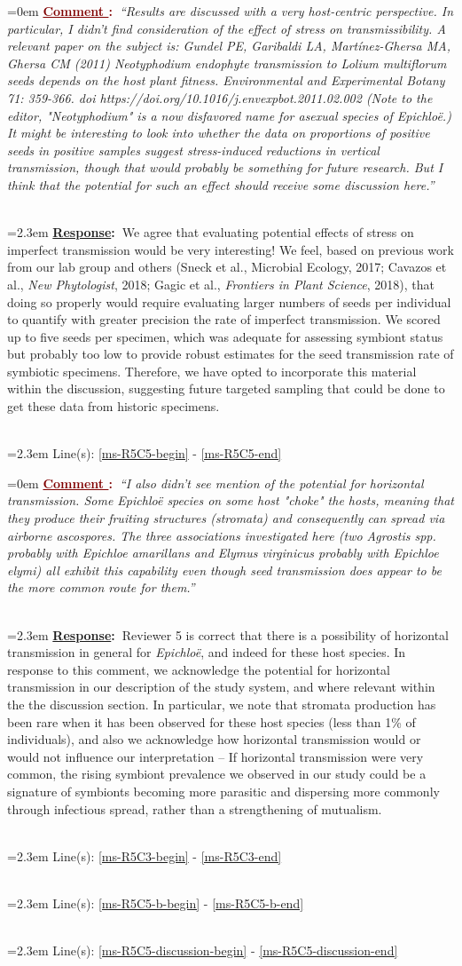 \documentclass[12pt]{article}
\newcounter{cN}
\newcommand{\comment}[1]{
	\vspace{2em}
	\refstepcounter{cN} %
	\noindent \hangindent=0em \textbf{\textcolor{Maroon}{\uline{Comment \thecN}:~}}\emph{``#1''}
	}
\newcommand{\response}[1]{
	\\[0.25em]
	\hangindent=2.3em \textbf{\textcolor{NavyBlue}{\uline{Response}:~}}#1
	}
\newcommand{\linesref}[2]{
		\\[0.25em]
	\hangindent=2.3em {\color{Mahogany} Line(s): \ref{#1} - \ref{#2}}
}
\begin{document}
\comment{Results are discussed with a very host-centric perspective. In particular, I didn't find consideration of the effect of stress on transmissibility. A relevant paper on the subject is: Gundel PE, Garibaldi LA, Martínez-Ghersa MA, Ghersa CM (2011) Neotyphodium endophyte transmission to Lolium multiflorum seeds depends on the host plant fitness. Environmental and Experimental Botany 71: 359-366. doi https://doi.org/10.1016/j.envexpbot.2011.02.002 (Note to the editor, "Neotyphodium" is a now disfavored name for asexual species of Epichloë.) It might be interesting to look into whether the data on proportions of positive seeds in positive samples suggest stress-induced reductions in vertical transmission, though that would probably be something for future research. But I think that the potential for such an effect should receive some discussion here.}
\response{We agree that evaluating potential effects of stress on imperfect transmission would be very interesting! We feel, based on previous work from our lab group and others (Sneck et al., {Microbial Ecology}, 2017; Cavazos et al., \emph{New Phytologist}, 2018; Gagic et al., \emph{Frontiers in Plant Science}, 2018), that doing so properly would require evaluating larger numbers of seeds per individual to quantify with greater precision the rate of imperfect transmission. 
We scored up to five seeds per specimen, which was adequate for assessing symbiont status but probably too low to provide robust estimates for the seed transmission rate of symbiotic specimens. 
Therefore, we have opted to incorporate this material within the discussion, suggesting future targeted sampling that could be done to get these data from historic specimens.}
\linesref{ms-R5C5-begin}{ms-R5C5-end}


\comment{I also didn't see mention of the potential for horizontal transmission. Some \emph{Epichloë} species on some host "choke" the hosts, meaning that they produce their fruiting structures (stromata) and consequently can spread via airborne ascospores. The three associations investigated here (two \emph{Agrostis} spp. probably with \emph{Epichloe amarillans} and \emph{Elymus virginicus} probably with \emph{Epichloe elymi}) all exhibit this capability even though seed transmission does appear to be the more common route for them.}
\response{Reviewer 5 is correct that there is a possibility of horizontal transmission in general for \emph{Epichloë}, and indeed for these host species. In response to this comment, we acknowledge the potential for horizontal transmission in our description of the study system, and where relevant within the the discussion section. In particular, we note that stromata production has been rare when it has been observed for these host species (less than 1\% of individuals), and also we acknowledge how horizontal transmission would or would not influence our interpretation -- If horizontal transmission were very common, the rising symbiont prevalence we observed in our study could be a signature of symbionts becoming more parasitic and dispersing more commonly through infectious spread, rather than a strengthening of mutualism.}
\linesref{ms-R5C3-begin}{ms-R5C3-end}
\linesref{ms-R5C5-b-begin}{ms-R5C5-b-end}
\linesref{ms-R5C5-discussion-begin}{ms-R5C5-discussion-end} 
\end{document}
